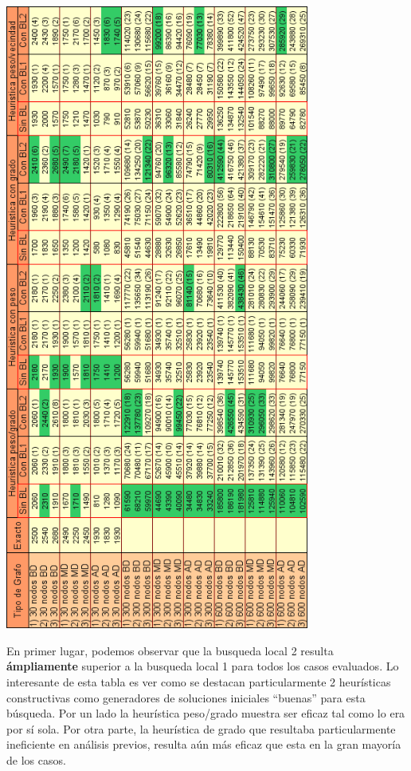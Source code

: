 \documentclass[a4paper,11pt] {article}
\begin{document}
\begin{center}
 \includegraphics[width=0.75\textwidth]{tablas/tablaHCBL.png}
\end{center}

En primer lugar, podemos observar que la busqueda local 2 resulta \textbf{ámpliamente} superior a la busqueda local 1 para todos los casos evaluados. Lo interesante de esta tabla es ver como se destacan particularmente 2 heurísticas constructivas como generadores de soluciones iniciales ``buenas'' para esta búsqueda. Por un lado la heurística peso/grado muestra ser eficaz tal como lo era por sí sola. Por otra parte, la heurística de grado que resultaba particularmente ineficiente en análisis previos, resulta aún más eficaz que esta en la gran mayoría de los casos.
\end{document}
